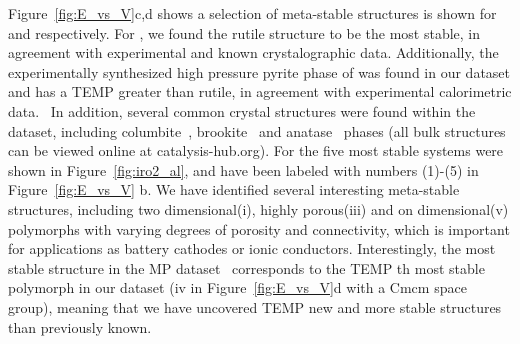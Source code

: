 Figure~\ref{fig:E_vs_V}c,d shows a selection of meta-stable structures is shown for \IrOtwo and \IrOthree respectively.
%
For \IrOtwo, we found the rutile structure to be the most stable,
in agreement with experimental and known crystalographic data.
%
Additionally, the experimentally synthesized high pressure pyrite phase of \IrOtwo was found in our dataset and has a \DHf TEMP greater than rutile, in agreement with experimental calorimetric data.~\cite{bolzan1997structural, shirako2014synthesis}
%
%
In addition, several common \ABtwo crystal structures were found within the dataset, including columbite~\cite{columbite}, brookite~\cite{brookite} and anatase~\cite{anatase} phases
(all bulk structures can be viewed online at catalysis-hub.org).
%
For \IrOthree the five most stable systems were shown in Figure~\ref{fig:iro2_al}, and have been labeled with numbers (1)-(5) in Figure~\ref{fig:E_vs_V} b.
%
We have identified several interesting meta-stable structures, including two dimensional(i), highly porous(iii) and on dimensional(v) polymorphs with varying degrees of porosity and connectivity,
which is important for applications as battery cathodes or ionic conductors.\cite{}
%
%
Interestingly, the most stable \IrOthree structure in the MP dataset~\cite{mp-1097041} corresponds to the TEMP th most stable \IrOthree polymorph in our dataset
(iv in Figure~\ref{fig:E_vs_V}d with a Cmcm space group),
meaning that we have uncovered TEMP new and more stable \IrOthree structures than previously known.
